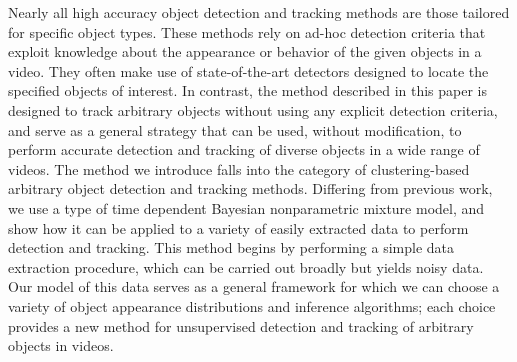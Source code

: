 \documentclass[twocolumn, final]{svjour3}
\begin{document}
Nearly all high accuracy object detection and tracking methods are those tailored for specific object types. These methods rely on ad-hoc detection criteria that exploit knowledge about the appearance or behavior of the given objects in a video. They often make use of state-of-the-art detectors designed to locate the specified objects of interest. In contrast, the method described in this paper is designed to track arbitrary objects without using any explicit detection criteria, and serve as a general strategy that can be used, without modification, to perform accurate detection and tracking of diverse objects in a wide range of videos. The method we introduce falls into the category of clustering-based arbitrary object detection and tracking methods. Differing from previous work, we use a type of time dependent Bayesian nonparametric mixture model, and show how it can be applied to a variety of easily extracted data to perform detection and tracking. This method begins by performing a simple data extraction procedure, which can be carried out broadly but yields noisy data. Our model of this data serves as a general framework for which we can choose a variety of object appearance distributions and inference algorithms; each choice provides a new method for unsupervised detection and tracking of arbitrary objects in videos.


\end{document}

